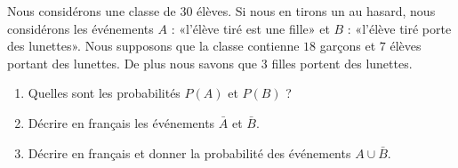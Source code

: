 
\begin{exercice}\label{exosmath-0453}

    Nous considérons une classe de \( 30\) élèves. Si nous en tirons un au hasard, nous considérons les événements  \( A\) : «l'élève tiré est une fille»  et \( B\) : «l'élève tiré porte des lunettes». Nous supposons que la classe contienne \( 18\) garçons et \( 7\) élèves portant des lunettes. De plus nous savons que \( 3\) filles portent des lunettes.
    \begin{enumerate}
        \item
            Quelles sont les probabilités \( P(A)\) et \( P(B)\) ?
        \item
            Décrire en français les événements \( \bar A\) et \( \bar B\).
        \item
            Décrire en français et donner la probabilité des événements \( A\cup\bar B\).
    \end{enumerate}

\end{exercice}
